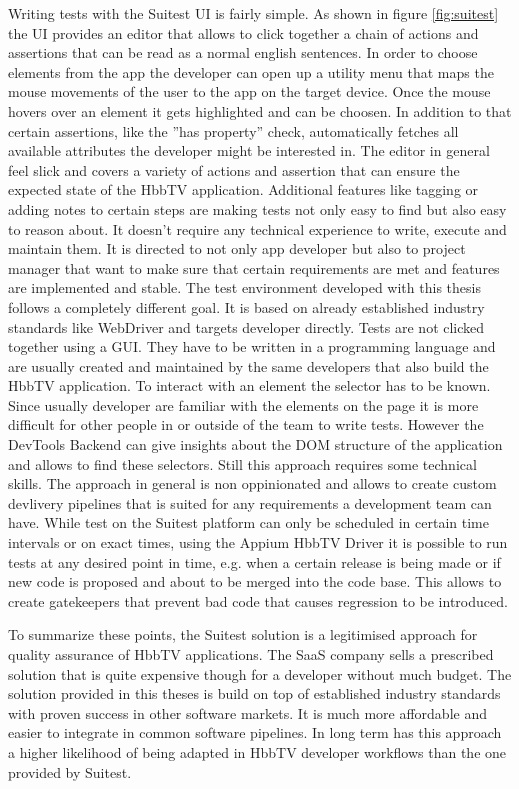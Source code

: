 Writing tests with the Suitest UI is fairly simple. As shown in figure \ref{fig:suitest} the UI provides an editor
that allows to click together a chain of actions and assertions that can be read as a normal english sentences. In
order to choose elements from the app the developer can open up a utility menu that maps the mouse movements of the
user to the app on the target device. Once the mouse hovers over an element it gets highlighted and can be choosen.
In addition to that certain assertions, like the ''has property'' check, automatically fetches all available attributes
the developer might be interested in. The editor in general feel slick and covers a variety of actions and assertion
that can ensure the expected state of the HbbTV application. Additional features like tagging or adding notes to
certain steps are making tests not only easy to find but also easy to reason about. It doesn't require any technical
experience to write, execute and maintain them. It is directed to not only app developer but also to project manager
that want to make sure that certain requirements are met and features are implemented and stable. The test environment
developed with this thesis follows a completely different goal. It is based on already established industry standards
like WebDriver and targets developer directly. Tests are not clicked together using a GUI. They have to be written in
a programming language and are usually created and maintained by the same developers that also build the HbbTV
application. To interact with an element the selector has to be known. Since usually developer are familiar with the
elements on the page it is more difficult for other people in or outside of the team to write tests. However the
DevTools Backend can give insights about the DOM structure of the application and allows to find these selectors.
Still this approach requires some technical skills. The approach in general is non oppinionated and allows to create
custom devlivery pipelines that is suited for any requirements a development team can have. While test on the Suitest
platform can only be scheduled in certain time intervals or on exact times, using the Appium HbbTV Driver it is
possible to run tests at any desired point in time, e.g. when a certain release is being made or if new code is
proposed and about to be merged into the code base. This allows to create gatekeepers that prevent bad code that
causes regression to be introduced.

To summarize these points, the Suitest solution is a legitimised approach for quality assurance of HbbTV applications.
The SaaS company sells a prescribed solution that is quite expensive though for a developer without much budget. The
solution provided in this theses is build on top of established industry standards with proven success in other
software markets. It is much more affordable and easier to integrate in common software pipelines. In long term has this
approach a higher likelihood of being adapted in HbbTV developer workflows than the one provided by Suitest.
